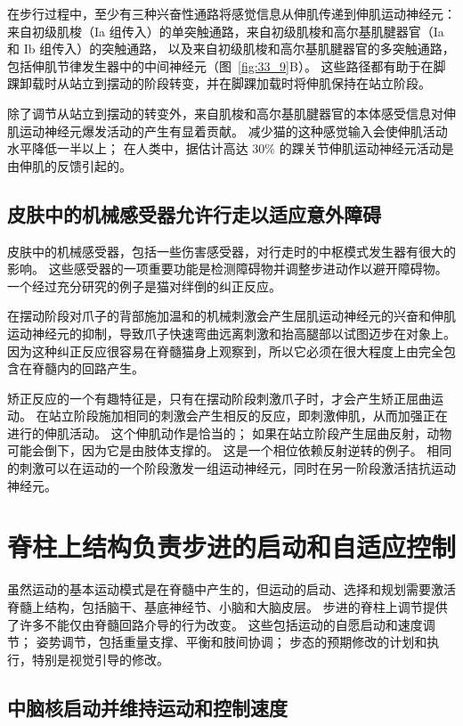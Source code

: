 在步行过程中，至少有三种兴奋性通路将感觉信息从伸肌传递到伸肌运动神经元：
来自初级肌梭（Ia 组传入）的单突触通路，来自初级肌梭和高尔基肌腱器官（Ia 和 Ib 组传入）的突触通路， 以及来自初级肌梭和高尔基肌腱器官的多突触通路，包括伸肌节律发生器中的中间神经元（图~\ref{fig:33_9}B）。
这些路径都有助于在脚踝卸载时从站立到摆动的阶段转变，并在脚踝加载时将伸肌保持在站立阶段。


除了调节从站立到摆动的转变外，来自肌梭和高尔基肌腱器官的本体感受信息对伸肌运动神经元爆发活动的产生有显着贡献。
减少猫的这种感觉输入会使伸肌活动水平降低一半以上；
在人类中，据估计高达 30\% 的踝关节伸肌运动神经元活动是由伸肌的反馈引起的。



\subsection{皮肤中的机械感受器允许行走以适应意外障碍}

皮肤中的机械感受器，包括一些伤害感受器，对行走时的中枢模式发生器有很大的影响。
这些感受器的一项重要功能是检测障碍物并调整步进动作以避开障碍物。
一个经过充分研究的例子是猫对绊倒的纠正反应。


在摆动阶段对爪子的背部施加温和的机械刺激会产生屈肌运动神经元的兴奋和伸肌运动神经元的抑制，导致爪子快速弯曲远离刺激和抬高腿部以试图迈步在对象上。
因为这种纠正反应很容易在脊髓猫身上观察到，所以它必须在很大程度上由完全包含在脊髓内的回路产生。


矫正反应的一个有趣特征是，只有在摆动阶段刺激爪子时，才会产生矫正屈曲运动。
在站立阶段施加相同的刺激会产生相反的反应，即刺激伸肌，从而加强正在进行的伸肌活动。
这个伸肌动作是恰当的；
如果在站立阶段产生屈曲反射，动物可能会倒下，因为它是由肢体支撑的。
这是一个相位依赖反射逆转的例子。
相同的刺激可以在运动的一个阶段激发一组运动神经元，同时在另一阶段激活拮抗运动神经元。



\section{脊柱上结构负责步进的启动和自适应控制}

虽然运动的基本运动模式是在脊髓中产生的，但运动的启动、选择和规划需要激活脊髓上结构，包括脑干、基底神经节、小脑和大脑皮层。
步进的脊柱上调节提供了许多不能仅由脊髓回路介导的行为改变。
这些包括运动的自愿启动和速度调节；
姿势调节，包括重量支撑、平衡和肢间协调；
步态的预期修改的计划和执行，特别是视觉引导的修改。



\subsection{中脑核启动并维持运动和控制速度}

